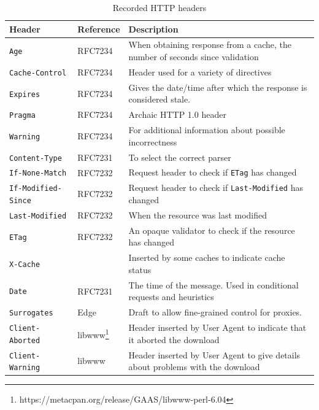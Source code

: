 \documentclass{llncs}
\newcommand{\httph}[1]{\texttt{#1}}
\begin{document}
\begin{subappendices}
\begin{table}
\caption{Recorded HTTP headers}\label{tab:headers}
 \begin{tabular}{ | l |  p{1.4cm} | p{6.8cm} |}
    \hline
    Header & Reference & Description \\ \hline
\httph{Age} & RFC7234 & When obtaining response from a cache, the number of
seconds since validation \\ \hline
\httph{Cache-Control} & RFC7234 & Header used for a variety of directives \\ \hline
\httph{Expires} & RFC7234  & Gives the date/time after which the
   response is considered stale. \\ \hline
\httph{Pragma} & RFC7234 & Archaic HTTP 1.0 header  \\ \hline
\httph{Warning} & RFC7234  & For additional information about possible incorrectness \\ \hline
\httph{Content-Type} & RFC7231 & To select the correct parser \\ \hline
\httph{If-None-Match} & RFC7232  & Request header to check if
                                   \httph{ETag} has changed   \\ \hline
\httph{If-Modified-Since} & RFC7232  & Request header to check if
                                   \httph{Last-Modified} has changed    \\ \hline
\httph{Last-Modified} & RFC7232 & When the resource was last modified \\ \hline
\httph{ETag} & RFC7232 & An opaque validator to check if the resource
has changed  \\ \hline
\httph{X-Cache} &  & Inserted by some caches to indicate cache status \\ \hline
\httph{Date} & RFC7231 & The time of the message. Used in conditional requests
and heuristics \\ \hline
\httph{Surrogates} & Edge \cite{edgearch} & Draft
to allow fine-grained control for proxies. \\ \hline
\httph{Client-Aborted} & libwww\footnote{https://metacpan.org/release/GAAS/libwww-perl-6.04}  & Header inserted by User
Agent to indicate that it aborted the download \\ \hline
\httph{Client-Warning} & libwww  & Header inserted by User
Agent to give details about problems with the download \\ \hline

    \hline
    \end{tabular}
\end{table}



\end{subappendices}
\end{document}
